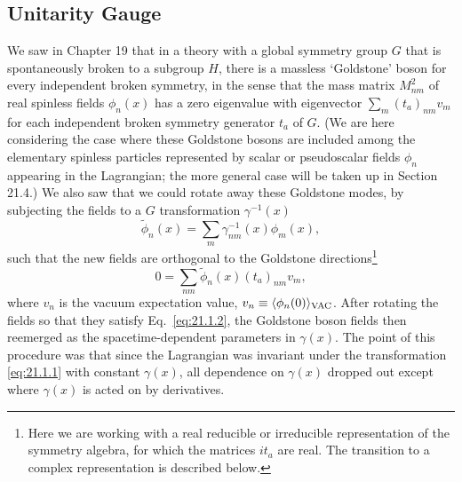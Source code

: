 \subsection{Unitarity Gauge}
\label{sec:21.1}

We saw in Chapter 19 that in a theory with a global symmetry group $G$ that
is spontaneously broken to a subgroup $H$, there is a massless `Goldstone'
boson for every independent broken symmetry, in the sense that the mass
matrix $M^2_{nm}$ of real spinless fields $\phi_n(x)$ has a zero eigenvalue
with eigenvector $\sum_m(t_a)_{nm}v_m$ for each independent broken
symmetry generator $t_a$ of $G$. (We are here considering the case
where these Goldstone bosons are included among the elementary spinless
particles represented by scalar or pseudoscalar fields $\phi_n$ appearing
in the Lagrangian; the more general case will be taken up in Section 21.4.)
We also saw that we could rotate away these Goldstone modes, by subjecting
the fields to a $G$ transformation $\gamma^{-1}(x)$
\begin{equation}
 \widetilde{\phi}_n(x)
 =\sum_m\gamma^{-1}_{nm}(x)\phi_m(x),
 \tag{21.1.1}\label{eq:21.1.1}
\end{equation}
such that the new fields are orthogonal to the Goldstone
directions\footnote{Here we are working with a real reducible or irreducible
representation of the symmetry algebra, for which the matrices $it_a$
are real. The transition to a complex representation is described below.}
\begin{equation}
 0=\sum_{nm}\widetilde{\phi}_n(x)(t_a)_{nm}v_m,
 \tag{21.1.2}\label{eq:21.1.2}
\end{equation}
where $v_n$ is the vacuum expectation value,
$v_n\equiv\langle\phi_n(0)\rangle_{\rm VAC}$. After rotating the fields so
that they satisfy Eq.~\eqref{eq:21.1.2}, the Goldstone boson fields then
reemerged as the spacetime-dependent parameters in $\gamma(x)$. The point
of this procedure was that since the Lagrangian was invariant under the
transformation \eqref{eq:21.1.1} with constant $\gamma(x)$, all dependence
on $\gamma(x)$ dropped out except where $\gamma(x)$ is acted on by
derivatives.


